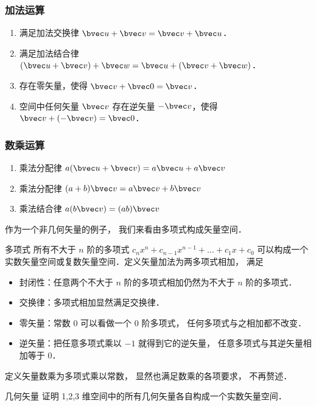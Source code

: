 \subsubsection{加法运算}
\begin{enumerate}
\item 满足加法交换律 $\bvec u + \bvec v = \bvec v + \bvec u$．
\item 满足加法结合律 $(\bvec u + \bvec v) + \bvec w = \bvec u + (\bvec v + \bvec w)$．
\item 存在零矢量，使得 $\bvec v + \bvec 0 = \bvec v$．
\item 空间中任何矢量 $\bvec v$ 存在逆矢量 $-\bvec v$，使得 $\bvec v + (-\bvec v) = \bvec 0$．
\end{enumerate}

\subsubsection{数乘运算}
\begin{enumerate}
\item 乘法分配律 $a(\bvec u + \bvec v) = a\bvec u + a\bvec v$ 
\item 乘法分配律 $(a + b)\bvec v = a\bvec v + b\bvec v$
\item 乘法结合律 $a (b \bvec v) = (ab) \bvec v$
\end{enumerate}

作为一个非几何矢量的例子， 我们来看由多项式构成矢量空间．

\begin{example}{多项式}\label{LSpace_ex1}
所有不大于 $n$ 阶的多项式 $c_n x^n + c_{n-1} x^{n-1} + \dots + c_1 x + c_0$ 可以构成一个实数矢量空间或复数矢量空间．定义矢量加法为两多项式相加， 满足
\begin{itemize}
\item 封闭性：任意两个不大于 $n$ 阶的多项式相加仍然为不大于 $n$ 阶的多项式．
\item 交换律：多项式相加显然满足交换律．
\item 零矢量：常数 0 可以看做一个 0 阶多项式， 任何多项式与之相加都不改变．
\item 逆矢量：把任意多项式乘以 $-1$ 就得到它的逆矢量， 任意多项式与其逆矢量相加等于 0．
\end{itemize}
定义矢量数乘为多项式乘以常数， 显然也满足数乘的各项要求， 不再赘述．
\end{example}

\begin{exercise}{几何矢量}
证明 1,2,3 维空间中的所有几何矢量各自构成一个实数矢量空间．
\end{exercise}

